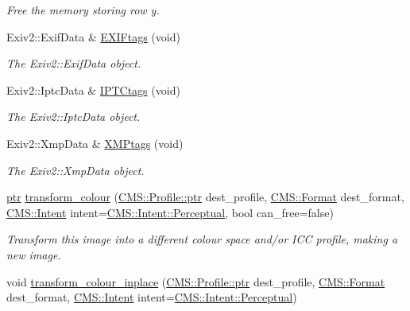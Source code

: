 \begin{DoxyCompactItemize}
\begin{DoxyCompactList}\small\item\em Free the memory storing row \textquotesingle{}y\textquotesingle{}. \end{DoxyCompactList}\item 
Exiv2\+::\+Exif\+Data \& \hyperlink{class_photo_finish_1_1_image_a56a6612bc223150cf8148cf7f96b88c9}{E\+X\+I\+Ftags} (void)
\begin{DoxyCompactList}\small\item\em The Exiv2\+::\+Exif\+Data object. \end{DoxyCompactList}\item 
Exiv2\+::\+Iptc\+Data \& \hyperlink{class_photo_finish_1_1_image_acf1cd5d69277be90373a3751d88584c6}{I\+P\+T\+Ctags} (void)
\begin{DoxyCompactList}\small\item\em The Exiv2\+::\+Iptc\+Data object. \end{DoxyCompactList}\item 
Exiv2\+::\+Xmp\+Data \& \hyperlink{class_photo_finish_1_1_image_a186fec390a5f37e2d26dec2b916ad513}{X\+M\+Ptags} (void)
\begin{DoxyCompactList}\small\item\em The Exiv2\+::\+Xmp\+Data object. \end{DoxyCompactList}\item 
\hyperlink{class_photo_finish_1_1_image_ab336203305ed3a1397d7245063353b5a}{ptr} \hyperlink{class_photo_finish_1_1_image_a797a2f06e01df0c863cf4f3d0579504a}{transform\+\_\+colour} (\hyperlink{class_c_m_s_1_1_profile_a7d5a80e1317d17dbfdf5ae69820ab08b}{C\+M\+S\+::\+Profile\+::ptr} dest\+\_\+profile, \hyperlink{class_c_m_s_1_1_format}{C\+M\+S\+::\+Format} dest\+\_\+format, \hyperlink{namespace_c_m_s_aabe6afbe3c2cd6188befc3096f1ea069}{C\+M\+S\+::\+Intent} intent=\hyperlink{namespace_c_m_s_aabe6afbe3c2cd6188befc3096f1ea069a09ab3095e9b2d0a7773cc3d2f0f879cd}{C\+M\+S\+::\+Intent\+::\+Perceptual}, bool can\+\_\+free=false)
\begin{DoxyCompactList}\small\item\em Transform this image into a different colour space and/or I\+CC profile, making a new image. \end{DoxyCompactList}\item 
void \hyperlink{class_photo_finish_1_1_image_aca7ebe2eaec99b320c750391434d8a9a}{transform\+\_\+colour\+\_\+inplace} (\hyperlink{class_c_m_s_1_1_profile_a7d5a80e1317d17dbfdf5ae69820ab08b}{C\+M\+S\+::\+Profile\+::ptr} dest\+\_\+profile, \hyperlink{class_c_m_s_1_1_format}{C\+M\+S\+::\+Format} dest\+\_\+format, \hyperlink{namespace_c_m_s_aabe6afbe3c2cd6188befc3096f1ea069}{C\+M\+S\+::\+Intent} intent=\hyperlink{namespace_c_m_s_aabe6afbe3c2cd6188befc3096f1ea069a09ab3095e9b2d0a7773cc3d2f0f879cd}{C\+M\+S\+::\+Intent\+::\+Perceptual})

\end{DoxyCompactItemize}
